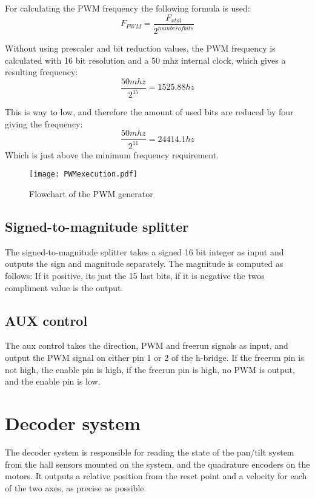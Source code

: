 For calculating the PWM frequency the following formula is used: 
\begin{equation}
F_{PWM} = \frac{F_{xtal}}{2^{number of bits}}
\end{equation}

Without using prescaler and bit reduction values, the PWM frequency is calculated with 16 bit resolution and a 50 mhz internal clock, which gives a resulting frequency:
\begin{equation}
\frac{50 mhz}{2^{15}} = 1525.88 hz
\end{equation}

This is way to low, and therefore the amount of used bits are reduced by four giving the frequency:
\begin{equation}
\frac{50 mhz}{2^{11}} = 24414.1 hz
\end{equation}
Which is just above the minimum frequency requirement.

\begin{figure}[htb]
\centering
\texttt{[image: PWMexecution.pdf]}
\caption{Flowchart of the PWM generator}
\label{fig:PWMchart}
\end{figure}

\subsection{Signed-to-magnitude splitter}
The signed-to-magnitude splitter takes a signed 16 bit integer as input and outputs the sign and magnitude separately.
The magnitude is computed as follows:
If it positive, its just the 15 last bits, if it is negative the twos compliment value is the output.

\subsection{AUX control}
The aux control takes the direction, PWM and freerun signals as input, and output the PWM signal on either pin 1 or 2 of the h-bridge. If the freerun pin is not high, the enable pin is high, if the freerun pin is high, no PWM is output, and the enable pin is low.

\section{Decoder system}
The decoder system is responsible for reading the state of the pan/tilt system from the hall sensors mounted on the system, and the quadrature encoders on the motors. 
It outputs a relative position from the reset point and a velocity for each of the two axes, as precise as possible.

